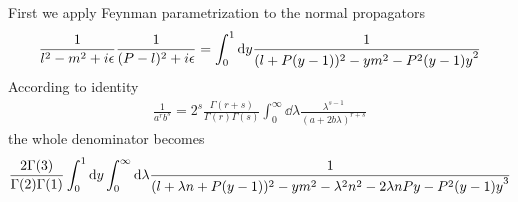 \documentclass{article}
\DeclarePairedDelimiter\bracketM{[}{]}
\let\bqty\relax
\newcommand{\bqty}[1]{\bracketM*{#1}}
\begin{document}
First we apply Feynman parametrization to the normal propagators
\begin{align}
	\frac{1}{l^2-m^2+i\epsilon}\frac{1}{(P-l)^2+i\epsilon}=\int_0^1\dd y\frac{1}{\bqty{(l+P (y-1))^2-ym^2 -P^2 (y-1) y}^2}
\end{align}
According to identity
\begin{align}
	\frac{1}{a^rb^s}=2^s\frac{\Gamma(r+s)}{\Gamma(r)\Gamma(s)}\int_0^\infty\dd\lambda\frac{\lambda^{s-1}}{(a+2b\lambda)^{r+s}}
\end{align}
the whole denominator becomes
\begin{align}
	\frac{2\Gamma(3)}{\Gamma(2)\Gamma(1)}\int_0^1\dd y\int_0^\infty\dd\lambda\frac{1}{\bqty{(l+\lambda  n+P (y-1))^2-ym^2 -\lambda ^2 n^2-2 \lambda  n P y-P^2 (y-1) y}^3}
\end{align}
\end{document}
